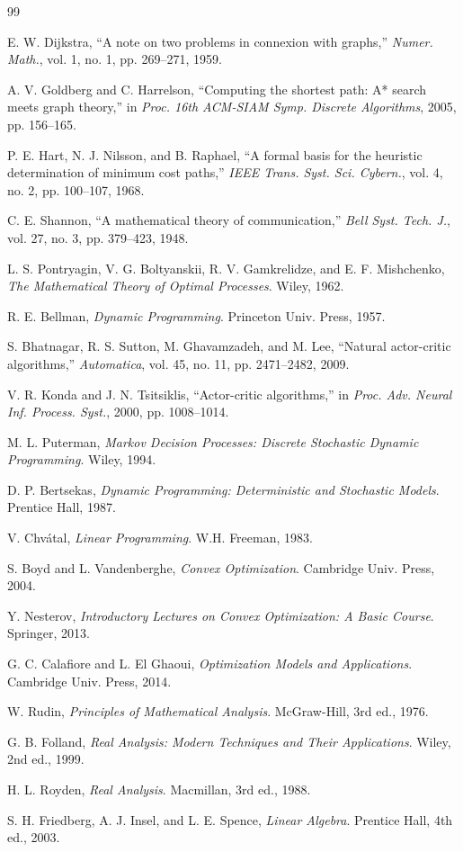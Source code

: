 \documentclass[twocolumn,11pt,a4paper]{article}
\begin{document}
\begin{thebibliography}{99}

 E. W. Dijkstra, ``A note on two problems in connexion with graphs,'' \emph{Numer. Math.}, vol. 1, no. 1, pp. 269–271, 1959.

 A. V. Goldberg and C. Harrelson, ``Computing the shortest path: A* search meets graph theory,'' in \emph{Proc. 16th ACM-SIAM Symp. Discrete Algorithms}, 2005, pp. 156–165.

 P. E. Hart, N. J. Nilsson, and B. Raphael, ``A formal basis for the heuristic determination of minimum cost paths,'' \emph{IEEE Trans. Syst. Sci. Cybern.}, vol. 4, no. 2, pp. 100–107, 1968.

 C. E. Shannon, ``A mathematical theory of communication,'' \emph{Bell Syst. Tech. J.}, vol. 27, no. 3, pp. 379–423, 1948.

 L. S. Pontryagin, V. G. Boltyanskii, R. V. Gamkrelidze, and E. F. Mishchenko, \emph{The Mathematical Theory of Optimal Processes}. Wiley, 1962.

 R. E. Bellman, \emph{Dynamic Programming}. Princeton Univ. Press, 1957.

 S. Bhatnagar, R. S. Sutton, M. Ghavamzadeh, and M. Lee, ``Natural actor-critic algorithms,'' \emph{Automatica}, vol. 45, no. 11, pp. 2471–2482, 2009.

 V. R. Konda and J. N. Tsitsiklis, ``Actor-critic algorithms,'' in \emph{Proc. Adv. Neural Inf. Process. Syst.}, 2000, pp. 1008–1014.

 M. L. Puterman, \emph{Markov Decision Processes: Discrete Stochastic Dynamic Programming}. Wiley, 1994.

 D. P. Bertsekas, \emph{Dynamic Programming: Deterministic and Stochastic Models}. Prentice Hall, 1987.

 V. Chvátal, \emph{Linear Programming}. W.H. Freeman, 1983.

 S. Boyd and L. Vandenberghe, \emph{Convex Optimization}. Cambridge Univ. Press, 2004.

 Y. Nesterov, \emph{Introductory Lectures on Convex Optimization: A Basic Course}. Springer, 2013.

 G. C. Calafiore and L. El Ghaoui, \emph{Optimization Models and Applications}. Cambridge Univ. Press, 2014.

 W. Rudin, \emph{Principles of Mathematical Analysis}. McGraw-Hill, 3rd ed., 1976.

 G. B. Folland, \emph{Real Analysis: Modern Techniques and Their Applications}. Wiley, 2nd ed., 1999.

 H. L. Royden, \emph{Real Analysis}. Macmillan, 3rd ed., 1988.

 S. H. Friedberg, A. J. Insel, and L. E. Spence, \emph{Linear Algebra}. Prentice Hall, 4th ed., 2003.

\end{thebibliography}
\end{document}
